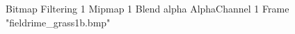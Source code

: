{Bitmap
	{Filtering 1}
	{Mipmap 1}
	{Blend alpha}
	{AlphaChannel 1}
	{Frame "fieldrime_grass1b.bmp"}
}
